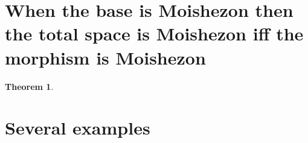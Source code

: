 \documentclass[11pt]{article}
\newtheorem{theorem}{Theorem}
\begin{document}
	\section{When the base is Moishezon then the total space is Moishezon iff the morphism is Moishezon}
	
	\begin{theorem}
		
	\end{theorem}
	\section{Several examples}
	
	
	\section{}
	
	
	
	
	
\end{document}
